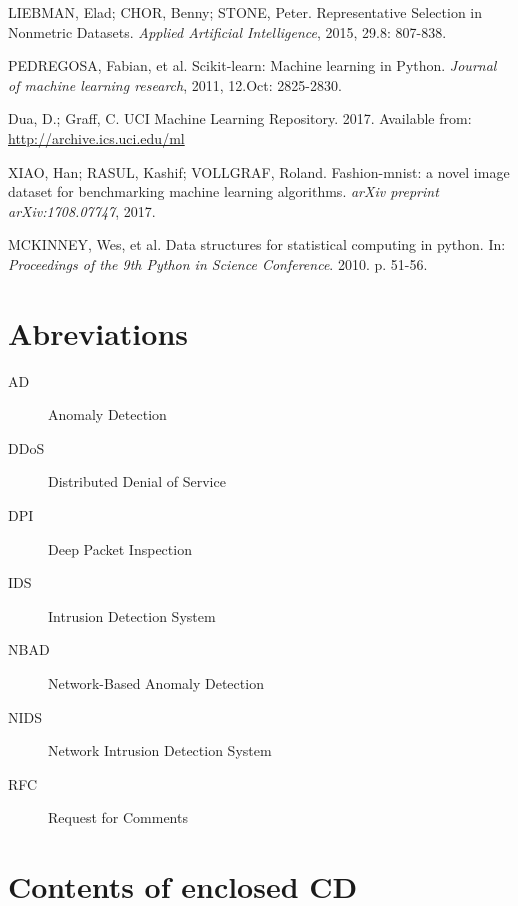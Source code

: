 \documentclass[thesis=B,english]{FITthesis}[2012/10/20]
\begin{document}
\begin{thebibliography}{99}
LIEBMAN, Elad; CHOR, Benny; STONE, Peter. Representative Selection in Nonmetric Datasets. \textit{Applied Artificial Intelligence}, 2015, 29.8: 807-838.

PEDREGOSA, Fabian, et al. Scikit-learn: Machine learning in Python. \textit{Journal of machine learning research}, 2011, 12.Oct: 2825-2830.

Dua, D.; Graff, C. UCI Machine Learning Repository. 2017. Available from: \url{http://archive.ics.uci.edu/ml}

XIAO, Han; RASUL, Kashif; VOLLGRAF, Roland. Fashion-mnist: a novel image dataset for benchmarking machine learning algorithms. \textit{arXiv preprint arXiv:1708.07747}, 2017.

MCKINNEY, Wes, et al. Data structures for statistical computing in python. In: \textit{Proceedings of the 9th Python in Science Conference}. 2010. p. 51-56.

\end{thebibliography}

\appendix

\chapter{Abreviations}
\begin{description}
    \item[AD] Anomaly Detection
    \item[DDoS] Distributed Denial of Service
    \item[DPI] Deep Packet Inspection
    \item[IDS] Intrusion Detection System
	\item[NBAD] Network-Based Anomaly Detection
	\item[NIDS] Network Intrusion Detection System
    \item[RFC] Request for Comments
\end{description}


\chapter{Contents of enclosed CD}


\begin{figure}
\end{figure}
\end{document}

